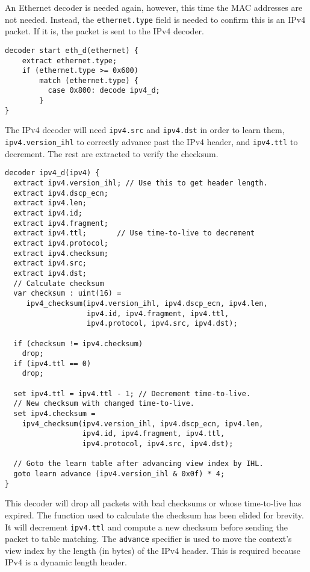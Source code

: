 An Ethernet decoder is needed again, however, this time the MAC
addresses are not needed. Instead, the \texttt{ethernet.type} field is needed to confirm
this is an IPv4 packet. If it is, the packet is sent to the IPv4 decoder.

\begin{lstlisting}
decoder start eth_d(ethernet) {
	extract ethernet.type;
	if (ethernet.type >= 0x600)
	    match (ethernet.type) {
	      case 0x800: decode ipv4_d;
	    }
}
\end{lstlisting}

The IPv4 decoder will need  \texttt{ipv4.src} and \texttt{ipv4.dst} in
order to learn them, \texttt{ipv4.version\_ihl} to
correctly advance past the IPv4 header, and \texttt{ipv4.ttl} to decrement. The rest are extracted to verify the checksum.

\begin{lstlisting}
decoder ipv4_d(ipv4) {
  extract ipv4.version_ihl; // Use this to get header length.
  extract ipv4.dscp_ecn;
  extract ipv4.len;
  extract ipv4.id;
  extract ipv4.fragment;
  extract ipv4.ttl;       // Use time-to-live to decrement
  extract ipv4.protocol;
  extract ipv4.checksum;
  extract ipv4.src;
  extract ipv4.dst;
  // Calculate checksum
  var checksum : uint(16) =
     ipv4_checksum(ipv4.version_ihl, ipv4.dscp_ecn, ipv4.len, 
                   ipv4.id, ipv4.fragment, ipv4.ttl, 
                   ipv4.protocol, ipv4.src, ipv4.dst);
                   
  if (checksum != ipv4.checksum)
    drop;
  if (ipv4.ttl == 0)
    drop;
    
  set ipv4.ttl = ipv4.ttl - 1; // Decrement time-to-live.
  // New checksum with changed time-to-live.
  set ipv4.checksum =
    ipv4_checksum(ipv4.version_ihl, ipv4.dscp_ecn, ipv4.len, 
                  ipv4.id, ipv4.fragment, ipv4.ttl, 
                  ipv4.protocol, ipv4.src, ipv4.dst);

  // Goto the learn table after advancing view index by IHL.
  goto learn advance (ipv4.version_ihl & 0x0f) * 4;
}
\end{lstlisting}

This decoder will drop all packets with bad checksums or whose time-to-live has 
expired. The function used to calculate the checksum
has been elided for brevity. It will decrement \texttt{ipv4.ttl} and compute a new checksum before 
sending the packet to table matching. The \texttt{advance} specifier is used to move the context's view index by the length (in bytes) of the IPv4 header. This is required because IPv4 is a dynamic length header. 

